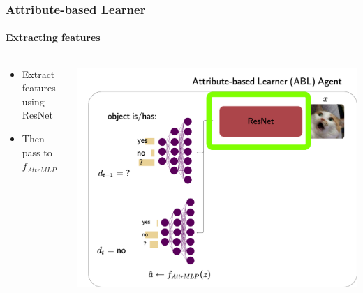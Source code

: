 \documentclass[9pt]{beamer}
\begin{document}
\begin{frame}
\frametitle{Attribute-based Learner}
\framesubtitle{Extracting features}
\begin{columns}[T]
	\begin{column}{.5\textwidth}
		\begin{itemize}
			\item Extract features using ResNet
			\item Then pass to $f_{AttrMLP}$
		\end{itemize}
	\end{column}
	\begin{column}{.5\textwidth}
		\includegraphics[width=\textwidth]{images/urdtc_parts_resnet.pdf}
	\end{column}
\end{columns}
\end{frame}
\end{document}
